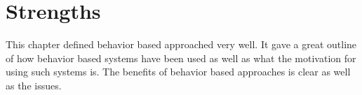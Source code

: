 \documentclass{article}
\begin{document}
\section*{Strengths}
This chapter defined behavior based approached very well. It gave a great outline of how behavior based systems have been used as well as what the motivation for using such systems is. The benefits of behavior based approaches is clear as well as the issues.

\cite{book}
\end{document}
